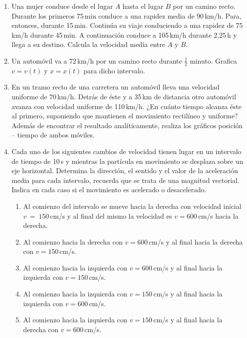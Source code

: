 \begin{enumerate}
  \item Una mujer conduce desde el lugar $A$ hasta el lugar $B$ por un camino recto. Durante los primeros 75\,min conduce a una rapidez media de 90\,km/h. Para, entonces, durante 15\,min. Continúa su viaje conduciendo a una rapidez de 75\,km/h durante 45\,min. A continuación conduce a 105\,km/h durante 2,25\,h y llega a su destino. Calcula la velocidad media entre $A$ y $B$.
  
  \item Un automóvil va a 72\,km/h por un camino recto durante $\frac{1}{2}$ minuto. Grafica $v =  v(t)$ y $x =  x(t)$ para dicho intervalo.
  
  \item En un tramo recto de una carretera un automóvil lleva una velocidad uniforme de 70\,km/h. Detrás de éste y a 35\,km de distancia otro automóvil avanza con velocidad uniforme de 110\,km/h. ¿En cuánto tiempo alcanza éste al primero, suponiendo que mantienen el movimiento rectilíneo y uniforme?\\
  Además de encontrar el resultado analíticamente, realiza los gráficos posición -- tiempo de ambos móviles.
  
  \item Cada uno de los siguientes cambios de velocidad tienen lugar en un intervalo de tiempo de 10\,s y mientras la partícula en movimiento se desplaza sobre un eje horizontal. Determina la dirección, el sentido y el valor de la aceleración media para cada intervalo, recuerda que se trata de una magnitud vectorial. Indica en cada caso si el movimiento es acelerado o desacelerado.
  \begin{enumerate}[label=\alph*)]
    \item Al comienzo del intervalo se mueve hacia la derecha con velocidad inicial $v ~ = ~ 150$\,cm/s y al final del mismo la velocidad es $v =  600$\,cm/s hacia la derecha.
    \item Al comienzo hacia la derecha con $v =  600$\,cm/s y al final hacia la derecha con $v =  150$\,cm/s.
    \item Al comienzo hacia la izquierda con $v =  600$\,cm/s y al final hacia la izquierda con $v =  150$\,cm/s.
    \item Al comienzo hacia la izquierda con $v =  150$\,cm/s y al final hacia la izquierda con $v =  600$\,cm/s.
    \item Al comienzo hacia la izquierda con $v =  150$\,cm/s y al final hacia la derecha con $v =  600$\,cm/s.
  \end{enumerate}
  

\end{enumerate}
